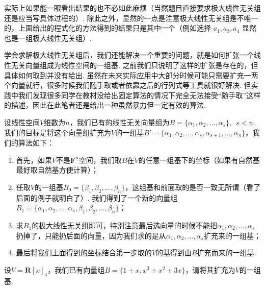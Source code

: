 实际上如果能一眼看出结果的也不必如此麻烦（当然题目直接要求极大线性无关组还是应当写具体过程的）. 除此之外，显然的一点是注意极大线性无关组是不唯一的，上面给出的程式化的方法得到的结果只是其中一个（例如选择 $a_1,a_3,a_4$ 显然也是一组极大线性无关组）.

学会求解极大线性无关组后，我们还能解决一个重要的问题，就是如何扩张一个线性无关向量组成为线性空间的一组基. 之前我们只说明了这样的扩张是存在的，但具体如何取到并没有给出. 虽然在未来实际应用中大部分时候可能只需要扩充一两个向量就行，很多时候我们随手取或者依靠之后的行列式等工具就很好解决. 但实践中我们发现很多同学在教材没给出固定算法的情况下完全无法接受``随手取''这样的描述，因此在此笔者还是给出一种虽然暴力但一定有效的算法.

设线性空间$V$维数为$n$，我们已有的线性无关向量组为$B=\{\alpha_1,\alpha_2,\ldots,\alpha_s\},\enspace s<n$. 我们的目标是将这个向量组扩充为$V$的一组基$B'=\{\alpha_1,\alpha_2,\ldots,\alpha_s,\alpha_{s+1},\ldots,\alpha_n\}$，我们的算法如下：
\begin{enumerate}
    \item 首先，如果$V$不是$\mathbf{F}^n$空间，我们取$B$在$V$的任意一组基下的坐标（如果有自然基最好取自然基方便计算）；

    \item 任取$V$的一组基$B_0=\{\beta_1,\beta_2,\ldots,\beta_n\}$，这组基和前面取的是否一致无所谓（看了后面的例子就明白了）. 我们得到了一个新的向量组$B_1=\{\alpha_1,\alpha_2,\ldots,\alpha_s,\beta_1,\beta_2,\ldots,\beta_n\}$；

    \item 求$B_1$的极大线性无关组即可，特别注意最后选向量的时候不能把$\alpha_1,\alpha_2,\ldots,\alpha_s$扔掉了，只能扔后面的向量，因为我们求的是从$\alpha_1,\alpha_2,\ldots,\alpha_s$扩充来的一组基；

    \item 最后将我们上面得到的坐标结合第一步取的$V$的基得到由$B$扩充而来的一组基.
\end{enumerate}

\begin{example}{}{}
    设$V=\mathbf{R}[x]_4$，我们已有向量组$B=\{1+x,x^3+x^2+3x\}$，请将其扩充为$V$的一组基.
\end{example}

